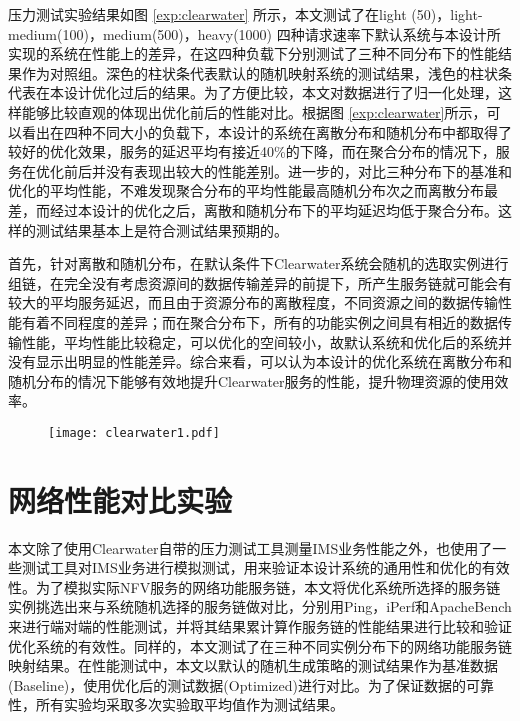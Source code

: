 压力测试实验结果如图 \ref{exp:clearwater} 所示，本文测试了在light (50)，light-medium(100)，medium(500)，heavy(1000) 四种请求速率下默认系统与本设计所实现的系统在性能上的差异，在这四种负载下分别测试了三种不同分布下的性能结果作为对照组。深色的柱状条代表默认的随机映射系统的测试结果，浅色的柱状条代表在本设计优化过后的结果。为了方便比较，本文对数据进行了归一化处理，这样能够比较直观的体现出优化前后的性能对比。根据图 \ref{exp:clearwater}所示，可以看出在四种不同大小的负载下，本设计的系统在离散分布和随机分布中都取得了较好的优化效果，服务的延迟平均有接近40\%的下降，而在聚合分布的情况下，服务在优化前后并没有表现出较大的性能差别。进一步的，对比三种分布下的基准和优化的平均性能，不难发现聚合分布的平均性能最高随机分布次之而离散分布最差，而经过本设计的优化之后，离散和随机分布下的平均延迟均低于聚合分布。这样的测试结果基本上是符合测试结果预期的。

首先，针对离散和随机分布，在默认条件下Clearwater系统会随机的选取实例进行组链，在完全没有考虑资源间的数据传输差异的前提下，所产生服务链就可能会有较大的平均服务延迟，而且由于资源分布的离散程度，不同资源之间的数据传输性能有着不同程度的差异；而在聚合分布下，所有的功能实例之间具有相近的数据传输性能，平均性能比较稳定，可以优化的空间较小，故默认系统和优化后的系统并没有显示出明显的性能差异。综合来看，可以认为本设计的优化系统在离散分布和随机分布的情况下能够有效地提升Clearwater服务的性能，提升物理资源的使用效率。

\begin{figure}[htp]
	\centering
	\texttt{[image: clearwater1.pdf]}
\end{figure}
\newpage
\section{网络性能对比实验}
本文除了使用Clearwater自带的压力测试工具测量IMS业务性能之外，也使用了一些测试工具对IMS业务进行模拟测试，用来验证本设计系统的通用性和优化的有效性。为了模拟实际NFV服务的网络功能服务链，本文将优化系统所选择的服务链实例挑选出来与系统随机选择的服务链做对比，分别用Ping，iPerf和ApacheBench来进行端对端的性能测试，并将其结果累计算作服务链的性能结果进行比较和验证优化系统的有效性。同样的，本文测试了在三种不同实例分布下的网络功能服务链映射结果。在性能测试中，本文以默认的随机生成策略的测试结果作为基准数据(Baseline)，使用优化后的测试数据(Optimized)进行对比。为了保证数据的可靠性，所有实验均采取多次实验取平均值作为测试结果。

